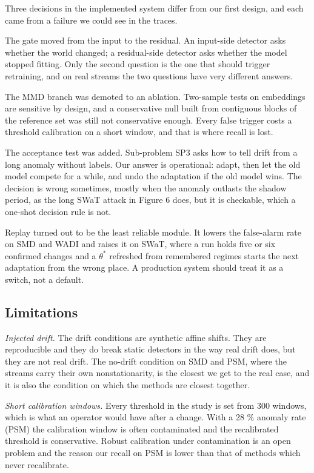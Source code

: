 Three decisions in the implemented system differ from our first design, and each came from a failure we could see in the traces.

The gate moved from the input to the residual. An input-side detector asks whether the world changed; a residual-side detector asks whether the model stopped fitting. Only the second question is the one that should trigger retraining, and on real streams the two questions have very different answers.

The MMD branch was demoted to an ablation. Two-sample tests on embeddings are sensitive by design, and a conservative null built from contiguous blocks of the reference set was still not conservative enough. Every false trigger costs a threshold calibration on a short window, and that is where recall is lost.

The acceptance test was added. Sub-problem SP3 asks how to tell drift from a long anomaly without labels. Our answer is operational: adapt, then let the old model compete for a while, and undo the adaptation if the old model wins. The decision is wrong sometimes, mostly when the anomaly outlasts the shadow period, as the long SWaT attack in Figure 6 does, but it is checkable, which a one-shot decision rule is not.

Replay turned out to be the least reliable module. It lowers the false-alarm rate on SMD and WADI and raises it on SWaT, where a run holds five or six confirmed changes and a \(\theta^*\) refreshed from remembered regimes starts the next adaptation from the wrong place. A production system should treat it as a switch, not a default.

\hypertarget{limitations}{%
\subsection{Limitations}\label{limitations}}

\emph{Injected drift.} The drift conditions are synthetic affine shifts. They are reproducible and they do break static detectors in the way real drift does, but they are not real drift. The no-drift condition on SMD and PSM, where the streams carry their own nonstationarity, is the closest we get to the real case, and it is also the condition on which the methods are closest together.

\emph{Short calibration windows.} Every threshold in the study is set from 300 windows, which is what an operator would have after a change. With a 28 \% anomaly rate (PSM) the calibration window is often contaminated and the recalibrated threshold is conservative. Robust calibration under contamination is an open problem and the reason our recall on PSM is lower than that of methods which never recalibrate.

